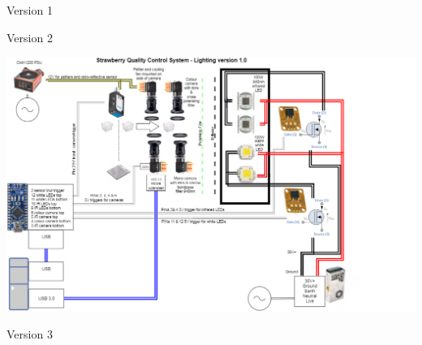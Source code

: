 \documentclass[fleqn,twoside,12pt]{report}
\begin{document}
\newpage

Version 1
\begin{minipage}[b]{0.9\linewidth}
	
\end{minipage}



\newpage
Version 2
\begin{minipage}[b]{0.9\linewidth}
	\includegraphics[scale=0.9,angle=270]{appendix/wiring_2.png}
\end{minipage}




\newpage
Version 3
\begin{minipage}[b]{0.9\linewidth}
	
\end{minipage}







\end{document}
